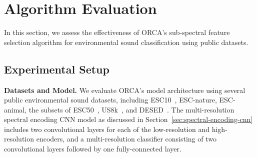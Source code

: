 \section{Algorithm Evaluation}
\label{sec:evaluation-on-datasets}

In this section, we assess the effectiveness of ORCA's sub-spectral feature selection algorithm for environmental sound classification using public datasets.


\subsection{Experimental Setup}

\noindent
\textbf{Datasets and Model.}
We evaluate ORCA's model architecture using several public environmental sound datasets, including ESC10~\cite{piczak2015esc}, ESC-nature, ESC-animal, the subsets of ESC50~\cite{piczak2015esc}, US8k~\cite{salamon2017us8k}, and DESED~\cite{turpault2019desed}. The multi-resolution spectral encoding CNN model as discussed in Section~\ref{sec:spectral-encoding-cnn} includes two convolutional layers for each of the low-resolution and high-resolution encoders, and a multi-resolution classifier consisting of two convolutional layers followed by one fully-connected layer.


